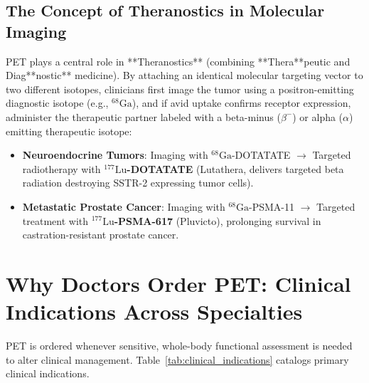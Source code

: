 \documentclass[11pt,a4paper]{article}
\begin{document}
\subsection{The Concept of Theranostics in Molecular Imaging}
PET plays a central role in **Theranostics** (combining **Thera**peutic and Diag**nostic** medicine). By attaching an identical molecular targeting vector to two different isotopes, clinicians first image the tumor using a positron-emitting diagnostic isotope (e.g., $^{68}\text{Ga}$), and if avid uptake confirms receptor expression, administer the therapeutic partner labeled with a beta-minus ($\beta^-$) or alpha ($\alpha$) emitting therapeutic isotope:
\begin{itemize}
    \item \textbf{Neuroendocrine Tumors}: Imaging with $^{68}\text{Ga}$-DOTATATE $\to$ Targeted radiotherapy with \textbf{$^{177}\text{Lu}$-DOTATATE} (Lutathera, delivers targeted beta radiation destroying SSTR-2 expressing tumor cells).
    \item \textbf{Metastatic Prostate Cancer}: Imaging with $^{68}\text{Ga}$-PSMA-11 $\to$ Targeted treatment with \textbf{$^{177}\text{Lu}$-PSMA-617} (Pluvicto), prolonging survival in castration-resistant prostate cancer.
\end{itemize}

\section{Why Doctors Order PET: Clinical Indications Across Specialties}

PET is ordered whenever sensitive, whole-body functional assessment is needed to alter clinical management. Table~\ref{tab:clinical_indications} catalogs primary clinical indications.
\end{document}
